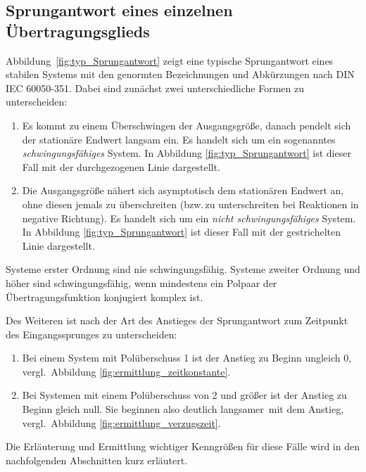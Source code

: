 \FloatBarrier
{}


\subsection{Sprungantwort eines einzelnen Übertragungsglieds} \label{sec:sprung-eines-ubertr}
Abbildung~\ref{fig:typ_Sprungantwort} zeigt eine typische Sprungantwort eines stabilen Systems mit den genormten Bezeichnungen und Abkürzungen nach DIN IEC 60050-351. Dabei sind zunächst zwei unterschiedliche Formen zu unterscheiden:


\begin{enumerate}
    \item Es kommt zu einem Überschwingen der Ausgangsgröße, danach pendelt sich der stationäre Endwert langsam ein. Es handelt sich um ein sogenanntes \emph{schwingungsfähiges} System. In Abbildung \ref{fig:typ_Sprungantwort} ist dieser Fall mit der durchgezogenen Linie dargestellt.
    \item Die Ausgangsgröße nähert sich asymptotisch dem stationären Endwert an, ohne diesen jemals zu überschreiten (bzw.\,zu unterschreiten bei Reaktionen in negative Richtung). Es handelt sich um ein \emph{nicht schwingungsfähiges} System. In Abbildung \ref{fig:typ_Sprungantwort} ist dieser Fall mit der gestrichelten Linie dargestellt.
\end{enumerate}
\begin{RstHinweisBox}
    Systeme erster Ordnung sind nie schwingungsfähig. Systeme zweiter Ordnung und höher sind schwingungsfähig, wenn mindestens ein Polpaar der Übertragungsfunktion konjugiert komplex ist.
\end{RstHinweisBox}
Des Weiteren ist nach der Art des Anstieges der Sprungantwort zum Zeitpunkt des Eingangssprunges zu unterscheiden:
\begin{enumerate}
    \item Bei einem System mit Polüberschuss 1 ist der Anstieg zu Beginn ungleich 0, vergl.~Abbildung \ref{fig:ermittlung_zeitkonstante}.
    \item Bei Systemen mit einem Polüberschuss von 2 und größer ist der Anstieg zu Beginn gleich null. Sie beginnen also deutlich \glqq langsamer\grqq~mit dem Anstieg, vergl.~Abbildung \ref{fig:ermittlung_verzugszeit}.
\end{enumerate}
Die Erläuterung und Ermittlung wichtiger Kenngrößen für diese Fälle wird in den nachfolgenden Abschnitten kurz erläutert.

